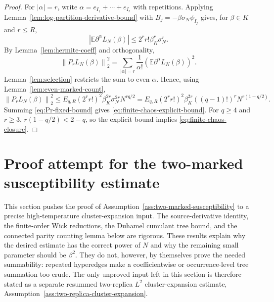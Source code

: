 \documentclass[11pt]{article}
\newcommand{\E}{\mathbb{E}}
\newcommand{\norm}[1]{\left\lVert #1\right\rVert}
\begin{document}
\begin{proof}
  For $|\alpha|=r$, write $\alpha=e_{I_1}+\cdots+e_{I_r}$ with repetitions.
  Applying Lemma~\ref{lem:log-partition-derivative-bound} with
  $B_j=-\beta\sigma_N\psi_{I_j}$ gives, for $\beta\in K$ and $r\leq R$,
  \begin{equation}\label{eq:fixed-alpha-bound}
    \left|\E\partial^\alpha L_N(\beta)\right|
    \leq
    2^rr!\beta_K^r\sigma_N^r.
  \end{equation}
  By Lemma~\ref{lem:hermite-coeff} and orthogonality,
  \begin{equation}\label{eq:Pr-norm-coeff}
    \norm{P_rL_N(\beta)}_2^2
    =
    \sum_{|\alpha|=r}\frac1{\alpha!}
    \left(\E\partial^\alpha L_N(\beta)\right)^2.
  \end{equation}
  Lemma~\ref{lem:selection} restricts the sum to even $\alpha$.  Hence, using
  Lemma~\ref{lem:even-marked-count},
  \begin{equation}\label{eq:Pr-fixed-bound}
    \norm{P_rL_N(\beta)}_2^2
    \leq
    E_{q,R}(2^rr!)^2\beta_K^{2r}
    \sigma_N^{2r}N^{rq/2}
    =
    E_{q,R}(2^rr!)^2\beta_K^{2r}((q-1)!)^r
    N^{r(1-q/2)}.
  \end{equation}
  Summing \eqref{eq:Pr-fixed-bound} gives
  \eqref{eq:finite-chaos-explicit-bound}.  For $q\geq4$ and $r\geq3$,
  $r(1-q/2)<2-q$, so the explicit bound implies
  \eqref{eq:finite-chaos-closure}.
\end{proof}



\section{Proof attempt for the two-marked susceptibility estimate}
\label{sec:two-marked-proof-attempt}

This section pushes the proof of
Assumption~\ref{ass:two-marked-susceptibility} to a precise high-temperature
cluster-expansion input.  The source-derivative identity, the finite-order Wick
reductions, the Duhamel cumulant tree bound, and the connected parity counting
lemma below are rigorous.  These results explain why the desired estimate has
the correct power of $N$ and why the remaining small parameter should be
$\beta^2$.  They do not, however, by themselves prove the needed summability:
repeated hyperedges make a coefficientwise or occurrence-level tree summation
too crude.  The only unproved input left in this section is therefore stated as
a separate resummed two-replica $L^2$ cluster-expansion estimate,
Assumption~\ref{ass:two-replica-cluster-expansion}.
\end{document}
